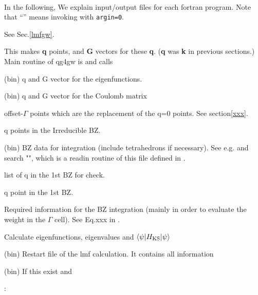 \ \\

\noindent In the following, We explain input/output files for each fortran program.
Note that ``'' means invoking  with \verb#argin=0#.

\newpage
See Sec.\ref{lmfgw}.

 This makes {\bf q} points, and {\bf G} vectors for these {\bf q}.
({\bf q} was {\bf k} in previous sections.)
Main routine of qg4gw is  and calls 

\infiles




\outfiles

 (bin) q and G vector for the eigenfunctions.

 (bin) q and G vector for the Coulomb matrix

   offset-$\Gamma$ points which are the replacement of
           the q=0 points. See section\ref{xxx}.

 q points in the Irreducible BZ.

 (bin) BZ data for integration (include tetrahedrons if necessary).
See e.g.  and search "",
which is a readin routine of this file defined in .

 list of q in the 1st BZ for check.

 q point in the 1st BZ.

 Required information for the BZ integration (mainly in
order to evaluate the weight in the $\Gamma$ cell). See Eq.xxx in \cite{xxx}.

 Calculate eigenfunctions, eigenvalues
and $\langle \psi | H_{\rm KS}|\psi\rangle$

\infiles


 (bin) Restart file of the lmf calculation. It contains all information

 (bin) If this exist and 

:


